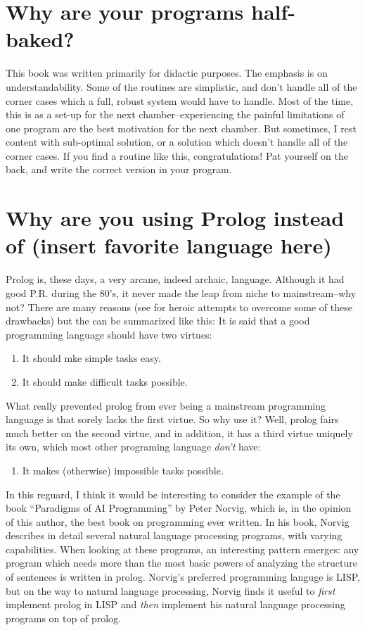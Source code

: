 \documentclass{book}[9pt]
\begin{document}
\section{Why are your programs half-baked?}

This book was written primarily for didactic purposes.  The emphasis
is on understandability.  Some of the routines are simplistic, and
don't handle all of the corner cases which a full, robust system would
have to handle.  Most of the time, this is as a set-up for the next
chamber--experiencing the painful limitations of one program are the
best motivation for the next chamber.  But sometimes, I rest content
with sub-optimal solution, or a solution which doesn't handle all of
the corner cases.  If you find a routine like this, congratulations!
Pat yourself on the back, and write the correct version in your
program.


\section{Why are you using Prolog instead of (insert favorite language here)}

Prolog is, these days, a very arcane, indeed archaic, language.
Although it had good P.R. during the 80's, it never made the leap from
niche to mainstream--why not?  There are many reasons (see
\cite{teaching_prolog_book} for heroic attempts to overcome some of
these drawbacks) but the can be summarized like this: It is said that
a good programming language should have two virtues:
\begin{enumerate}
\item It should mke simple tasks easy.
\item It should make difficult tasks possible.
\end{enumerate}
\noindent What really prevented prolog from ever being a mainstream
programming language is that sorely lacks the first virtue.
So why use it?  Well, prolog fairs much better on the second virtue, and
in addition, it has a third virtue uniquely its own, which most other 
programing language {\em don't} have:
\begin{enumerate}
\item It makes (otherwise) impossible tasks possible.
\end{enumerate}

In this reguard, I think it would be interesting to consider the
example of the book ``Paradigms of AI Programming'' by Peter Norvig,
which is, in the opinion of this author, the best book on programming
ever written.  In his book, Norvig describes in detail several natural
language processing programs, with varying capabilities.  When looking
at these programs, an interesting pattern emerges: any program which
needs more than the most basic powers of analyzing the structure of
sentences is written in prolog.  Norvig's preferred programming
languge is LISP, but on the way to natural language processing, Norvig
finds it useful to {\em first} implement prolog in LISP and {\em then}
implement his natural language processing programs on top of prolog.
\end{document}
